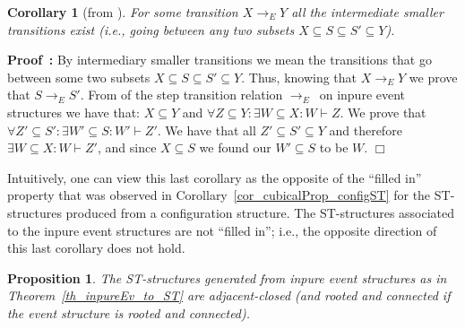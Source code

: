 \documentclass[submission,copyright,creativecommons]{eptcs}
\newtheorem{proposition}[theorem]{Proposition}
\newtheorem{corollary}[theorem]{Corollary}
\newenvironment{proof}[1][\!\!\,]{\vspace{1ex}\noindent\textbf{Proof #1: }}{\hfill$\Box$\vspace{2ex}}
\newcommand\stepTransEvGlabbeek{\ensuremath{\rightarrow_{E}}}
\newcommand\enableRelEv{\ensuremath{\vdash}}
\begin{document}
\begin{corollary}[from {\cite[Def.2.3]{GlabbeekP09configStruct}}]\label{cor_ev_intermediaryTrans}
For some transition $X\stepTransEvGlabbeek Y$ all the intermediate smaller transitions exist (i.e., going between any two subsets $X\subseteq S\subseteq S' \subseteq Y$).
\end{corollary}

\begin{proof}
By intermediary smaller transitions we mean the transitions that go between some two subsets $X\subseteq S\subseteq S' \subseteq Y$. Thus, knowing that $X\stepTransEvGlabbeek Y$ we prove that $S\stepTransEvGlabbeek S'$. From \cite[Def.2.3]{GlabbeekP09configStruct} of the step transition relation \stepTransEvGlabbeek\ on inpure event structures we have that: $X\subseteq Y$ and $\forall Z\subseteq Y:\exists W\subseteq X: W\enableRelEv Z$. We prove that $\forall Z'\subseteq S':\exists W'\subseteq S: W'\enableRelEv Z'$. We have that all $Z'\subseteq S'\subseteq Y$ and therefore $\exists W\subseteq X: W\enableRelEv Z'$, and since $X\subseteq S$ we found our $W'\subseteq S$ to be $W$.
\end{proof}


Intuitively, one can view this last corollary as the opposite of the ``filled in'' property that was observed in Corollary~\ref{cor_cubicalProp_configST} for the ST-structures produced from a configuration structure. The ST-structures associated to the inpure event structures are not ``filled in''; i.e., the opposite direction of this last corollary does not hold.

\begin{proposition}\label{prop_evnST_adjacentclosed}
The ST-structures generated from inpure event structures as in Theorem~\ref{th_inpureEv_to_ST} are adjacent-closed (and rooted and connected if the event structure is rooted and connected).
\end{proposition}
\end{document}
